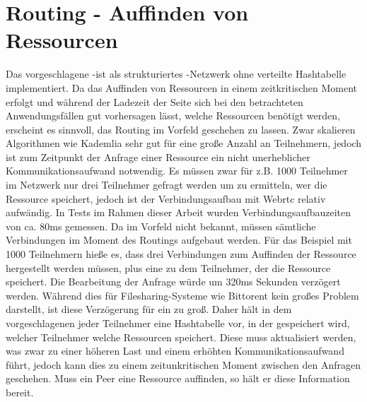 \section{Routing - Auffinden von Ressourcen}\label{k:routing}

Das vorgeschlagene \pTp-\cdn ist als strukturiertes \pTp-Netzwerk ohne verteilte Hashtabelle implementiert. Da das Auffinden von Ressourcen in einem zeitkritischen Moment erfolgt und während der Ladezeit der Seite sich bei den betrachteten Anwendungsfällen gut vorhersagen lässt, welche Ressourcen benötigt werden, erscheint es sinnvoll, das Routing im Vorfeld geschehen zu lassen. Zwar skalieren Algorithmen wie Kademlia \cite{kademlia} sehr gut für eine große Anzahl an Teilnehmern, jedoch ist zum Zeitpunkt der Anfrage einer Ressource ein nicht unerheblicher Kommunikationsaufwand notwendig. Es müssen zwar für z.B. 1000 Teilnehmer im Netzwerk nur drei Teilnehmer gefragt werden um zu ermitteln, wer die Ressource speichert, jedoch ist der Verbindungsaufbau mit Webrtc relativ aufwändig. In Tests im Rahmen dieser Arbeit wurden Verbindungsaufbauzeiten von ca. 80ms gemessen. Da im Vorfeld nicht bekannt, müssen sämtliche Verbindungen im Moment des Routings aufgebaut werden. Für das Beispiel mit 1000 Teilnehmern hieße es, dass drei Verbindungen zum Auffinden der Ressource hergestellt werden müssen, plus eine zu dem Teilnehmer, der die Ressource speichert. Die Bearbeitung der Anfrage würde um 320ms Sekunden verzögert werden. Während dies für Filesharing-Systeme wie Bittorent kein großes Problem darstellt, ist diese Verzögerung für ein \cdn zu groß. Daher hält in dem vorgeschlagenen \cdn jeder Teilnehmer eine Hashtabelle vor, in der gespeichert wird, welcher Teilnehmer welche Ressourcen speichert. Diese muss aktualisiert werden, was zwar zu einer höheren Last und einem erhöhten Kommunikationsaufwand führt, jedoch kann dies zu einem zeitunkritischen Moment zwischen den Anfragen geschehen. Muss ein Peer eine Ressource auffinden, so hält er diese Information bereit.


